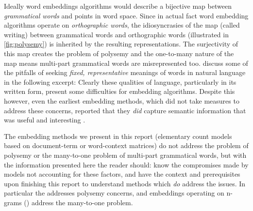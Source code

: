 Ideally word embeddings algorithms would describe a bijective map between \emph{grammatical words} and points in word space. Since in actual fact word embedding algorithms operate on \emph{orthographic words}, the idiosyncrasies of the map (called writing) between grammatical words and orthographic words (illustrated in \autoref{fig:polysemy}) is inherited by the resulting representations. The surjectivity of this map creates the problem of polysemy and the one-to-many nature of the map means multi-part grammatical words are misrepresented too.
\citeauthor{halliday-2004-lexicology} discuss some of the pitfalls of seeking \emph{fixed, representative} meanings of words in natural language in the following excerpt:
Clearly these qualities of language, particularly in its written form, present some difficulties for embedding algorithms. Despite this however, even the earliest embedding methods, which did not take measures to address these concerns, reported that they \emph{did} capture semantic information that was useful and interesting \parencite{deerwester-1990-indexing-by-lsa}.

The embedding methods we present in this report (elementary count models based on document-term or word-context matrices) do not address the problem of polysemy or the many-to-one problem of multi-part grammatical words, but with the information presented here the reader should: {\small{}} know the compromises made by models not accounting for these factors, and {\small{}} have the context and prerequisites upon finishing this report to understand methods which \emph{do} address the issues. In particular the  addresses polysemy concerns, and embeddings operating on n-grams () address the many-to-one problem.
